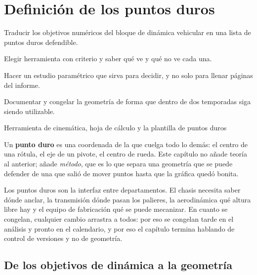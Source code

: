 \chapter{Definición de los puntos duros}
\label{ch:puntos_duros}

\begin{objetivos}
  \item Traducir los objetivos numéricos del bloque de dinámica vehicular en
        una lista de puntos duros defendible.
  \item Elegir herramienta con criterio y saber qué ve y qué no ve cada una.
  \item Hacer un estudio paramétrico que sirva para decidir, y no solo para
        llenar páginas del informe.
  \item Documentar y congelar la geometría de forma que dentro de dos
        temporadas siga siendo utilizable.
\end{objetivos}

%
{Herramienta de cinemática, hoja de cálculo y la plantilla de puntos duros}

Un \textbf{punto duro} es una coordenada de la que cuelga todo lo demás: el
centro de una rótula, el eje de un pivote, el centro de rueda. Este capítulo no
añade teoría al anterior; añade \emph{método}, que es lo que separa una
geometría que se puede defender de una que salió de mover puntos hasta que la
gráfica quedó bonita.

\begin{clave}
Los puntos duros son la interfaz entre departamentos. El chasis necesita saber
dónde anclar, la transmisión dónde pasan los palieres, la aerodinámica qué
altura libre hay y el equipo de fabricación qué se puede mecanizar. En cuanto
se congelan, cualquier cambio arrastra a todos: por eso se congelan tarde en el
análisis y pronto en el calendario, y por eso el capítulo termina hablando de
control de versiones y no de geometría.
\end{clave}

\section{De los objetivos de dinámica a la geometría}
\label{sec:puntos_duros:01}

